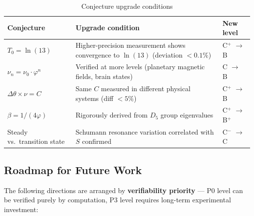 \documentclass[12pt,a4paper,twocolumn]{article}
\renewcommand{\phi}{\varphi}
\begin{document}
\begin{table}[htbp]
\centering
\caption{Conjecture upgrade conditions}
\label{tab:upgrade_conditions_en}
\begin{tabular}{lll}
\hline
Conjecture & Upgrade condition & New level \\
\hline
$T_0 = \ln(13)$ & Higher-precision measurement shows convergence to $\ln(13)$ (deviation $<0.1\%$) & C$^+$ $\to$ B \\
$\nu_n = \nu_0 \cdot \phi^n$ & Verified at more levels (planetary magnetic fields, brain states) & C $\to$ B \\
$\Delta\theta \times \nu = C$ & Same $C$ measured in different physical systems (diff $<5\%$) & C$^+$ $\to$ B \\
$\beta = 1/(4\phi)$ & Rigorously derived from $D_5$ group eigenvalues & C$^+$ $\to$ B$^+$ \\
Steady vs.\ transition state & Schumann resonance variation correlated with $S$ confirmed & C$^-$ $\to$ C \\
\hline
\end{tabular}
\end{table}

\subsection{Roadmap for Future Work}
\label{subsec:roadmap}

The following directions are arranged by \textbf{verifiability priority} --- P0 level can be verified purely by computation, P3 level requires long-term experimental investment:
\end{document}
